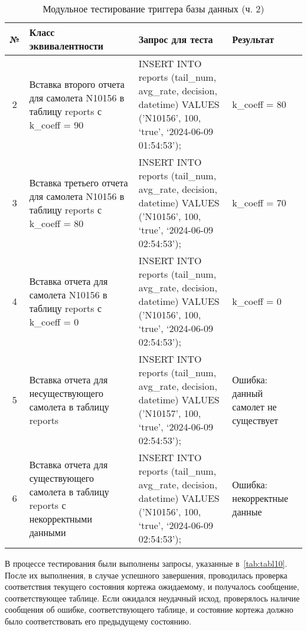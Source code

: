 \begin{table}[H]
    \centering
    \captionsetup{justification=raggedright}
    \caption{Модульное тестирование триггера базы данных (ч. 2)}
    \begin{tabular}{|c|p{}|p{}|p{}|}
        \hline
        № & Класс \newline эквивалентности & Запрос для теста & Результат \\
        \hline
        2 & Вставка второго \newline отчета для самолета N10156 в таблицу reports с k\_coeff = 90 & INSERT INTO reports (tail\_num, avg\_rate, decision, datetime) VALUES ('N10156', 100, `true', `2024-06-09 01:54:53'); & k\_coeff = 80 \\
        \hline
        3 & Вставка третьего отчета для самолета N10156 в таблицу reports с k\_coeff = 80 & INSERT INTO reports (tail\_num, avg\_rate, decision, datetime) VALUES ('N10156', 100, `true', `2024-06-09 02:54:53'); & k\_coeff = 70 \\
        \hline
        4 & Вставка отчета для \newline самолета N10156 в таблицу reports с \newline k\_coeff = 0 & INSERT INTO reports (tail\_num, avg\_rate, decision, datetime) VALUES ('N10156', 100, `true', `2024-06-09 02:54:53'); & k\_coeff = 0 \\
        \hline
        5 & Вставка отчета для несуществующего самолета в таблицу reports & INSERT INTO reports (tail\_num, avg\_rate, decision, datetime) VALUES ('N10157', 100, `true', `2024-06-09 02:54:53'); & Ошибка: данный самолет не существует \\
        \hline
        6 & Вставка отчета для \newline существующего \newline самолета в таблицу reports с \newline некорректными \newline данными & INSERT INTO reports (tail\_num, avg\_rate, decision, datetime) VALUES ('N10156', 100, `true', `2024-06-09 02:54:53'); & Ошибка: некорректные данные \\
        \hline
    \end{tabular}
    \label{tab:tabl11}
\end{table}

В процессе тестирования были выполнены запросы, указанные в~\ref{tab:tabl10}.
После их выполнения, в случае успешного завершения, проводилась проверка соответствия текущего состояния кортежа ожидаемому, и получалось сообщение, соответствующее таблице.
Если ожидался неудачный исход, проверялось наличие сообщения об ошибке, соответствующего таблице, и состояние кортежа должно было соответствовать его предыдущему состоянию.